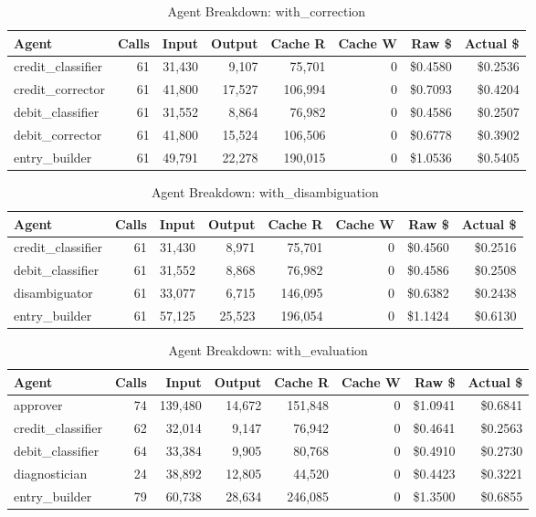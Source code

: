 \begin{table}[htbp]
\centering
\caption{Agent Breakdown: with\_correction}
\label{tab:agent-with-correction}
\begin{tabular}{l r rr rr rr}
\toprule
Agent & Calls & Input & Output & Cache R & Cache W & Raw \$ & Actual \$ \\
\midrule
  credit\_classifier & 61 & 31,430 & 9,107 & 75,701 & 0 & \$0.4580 & \$0.2536 \\
  credit\_corrector & 61 & 41,800 & 17,527 & 106,994 & 0 & \$0.7093 & \$0.4204 \\
  debit\_classifier & 61 & 31,552 & 8,864 & 76,982 & 0 & \$0.4586 & \$0.2507 \\
  debit\_corrector & 61 & 41,800 & 15,524 & 106,506 & 0 & \$0.6778 & \$0.3902 \\
  entry\_builder & 61 & 49,791 & 22,278 & 190,015 & 0 & \$1.0536 & \$0.5405 \\
\bottomrule
\end{tabular}
\end{table}

\begin{table}[htbp]
\centering
\caption{Agent Breakdown: with\_disambiguation}
\label{tab:agent-with-disambiguation}
\begin{tabular}{l r rr rr rr}
\toprule
Agent & Calls & Input & Output & Cache R & Cache W & Raw \$ & Actual \$ \\
\midrule
  credit\_classifier & 61 & 31,430 & 8,971 & 75,701 & 0 & \$0.4560 & \$0.2516 \\
  debit\_classifier & 61 & 31,552 & 8,868 & 76,982 & 0 & \$0.4586 & \$0.2508 \\
  disambiguator & 61 & 33,077 & 6,715 & 146,095 & 0 & \$0.6382 & \$0.2438 \\
  entry\_builder & 61 & 57,125 & 25,523 & 196,054 & 0 & \$1.1424 & \$0.6130 \\
\bottomrule
\end{tabular}
\end{table}

\begin{table}[htbp]
\centering
\caption{Agent Breakdown: with\_evaluation}
\label{tab:agent-with-evaluation}
\begin{tabular}{l r rr rr rr}
\toprule
Agent & Calls & Input & Output & Cache R & Cache W & Raw \$ & Actual \$ \\
\midrule
  approver & 74 & 139,480 & 14,672 & 151,848 & 0 & \$1.0941 & \$0.6841 \\
  credit\_classifier & 62 & 32,014 & 9,147 & 76,942 & 0 & \$0.4641 & \$0.2563 \\
  debit\_classifier & 64 & 33,384 & 9,905 & 80,768 & 0 & \$0.4910 & \$0.2730 \\
  diagnostician & 24 & 38,892 & 12,805 & 44,520 & 0 & \$0.4423 & \$0.3221 \\
  entry\_builder & 79 & 60,738 & 28,634 & 246,085 & 0 & \$1.3500 & \$0.6855 \\
\bottomrule
\end{tabular}
\end{table}
